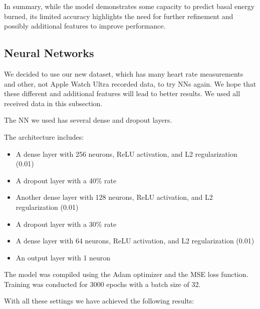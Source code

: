 In summary, while the model demonstrates some capacity to predict basal energy burned, its limited accuracy highlights the need for further refinement and possibly additional features to improve performance.

\subsection{Neural Networks}

We decided to use our new dataset, which has many heart rate measurements and other, not Apple Watch Ultra recorded data, to try NNs again. We hope that these different and additional features will lead to better results. We used all received data in this subsection.

The NN we used has several dense and dropout layers.

The architecture includes:
\begin{itemize}
    \item A dense layer with 256 neurons, ReLU activation, and L2 regularization (0.01)
    \item A dropout layer with a 40\% rate 
    \item Another dense layer with 128 neurons, ReLU activation, and L2 regularization (0.01)
    \item A dropout layer with a 30\% rate
    \item A dense layer with 64 neurons, ReLU activation, and L2 regularization (0.01)
    \item An output layer with 1 neuron
\end{itemize}

The model was compiled using the Adam optimizer and the MSE loss function. Training was conducted for 3000 epochs with a batch size of 32. 

With all these settings we have achieved the following results:

